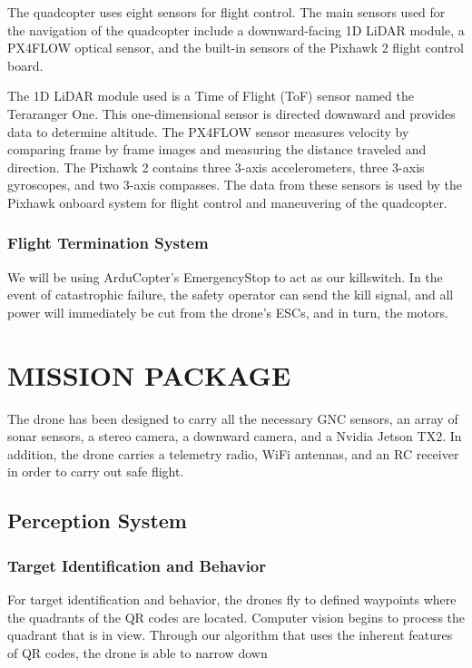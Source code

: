 \documentclass[12pt,letterpaper]{article}
\begin{document}
			The quadcopter uses eight sensors for flight control. The main sensors used for the navigation of the quadcopter include a downward-facing 1D LiDAR module, a PX4FLOW optical sensor, and the built-in sensors of the Pixhawk 2 flight control board.

			The 1D LiDAR module used is a Time of Flight (ToF) sensor named the Teraranger One. This one-dimensional sensor is directed downward and provides data to determine altitude. The PX4FLOW sensor measures velocity by comparing frame by frame images and measuring the distance traveled and direction. The Pixhawk 2 contains three 3-axis accelerometers, three 3-axis gyroscopes, and two 3-axis compasses. The data from these sensors is used by the Pixhawk onboard system for flight control and maneuvering of the quadcopter.


		\subsubsection*{Flight Termination System}
			We will be using ArduCopter's EmergencyStop to act as our killswitch. In the event of catastrophic failure, the safety operator can send the kill signal, and all power will immediately be cut from the drone's ESCs, and in turn, the motors.


\section*{MISSION PACKAGE}
	The drone has been designed to carry all the necessary GNC sensors, an array of sonar sensors, a stereo camera, a downward camera, and a Nvidia Jetson TX2. In addition, the drone carries a telemetry radio, WiFi antennas, and an RC receiver in order to carry out safe flight.
	\subsection*{Perception System}
		\subsubsection*{Target Identification and Behavior}
			For target identification and behavior, the drones fly to defined waypoints where the quadrants of the QR codes are located. Computer vision begins to process the quadrant that is in view. Through our algorithm that uses the inherent features of QR codes, the drone is able to narrow down 
			
\end{document}
